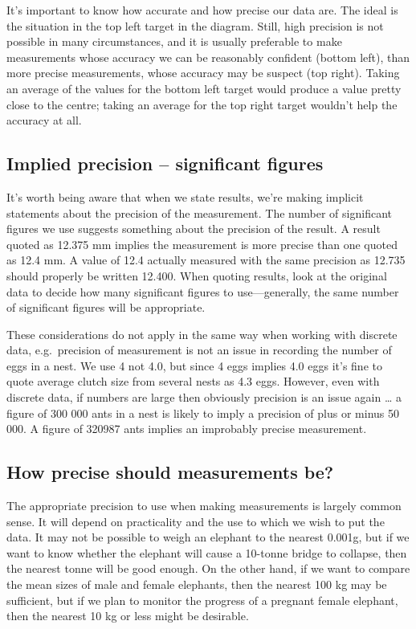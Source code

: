 \documentclass[
]{book}
\begin{document}
It's important to know how accurate and how precise our data are. The ideal is the situation in the top left target in the diagram. Still, high precision is not possible in many circumstances, and it is usually preferable to make measurements whose accuracy we can be reasonably confident (bottom left), than more precise measurements, whose accuracy may be suspect (top right). Taking an average of the values for the bottom left target would produce a value pretty close to the centre; taking an average for the top right target wouldn't help the accuracy at all.

\hypertarget{implied-precision-significant-figures}{%
\subsection{Implied precision -- significant figures}\label{implied-precision-significant-figures}}

It's worth being aware that when we state results, we're making implicit statements about the precision of the measurement. The number of significant figures we use suggests something about the precision of the result. A result quoted as 12.375 mm implies the measurement is more precise than one quoted as 12.4 mm. A value of 12.4 actually measured with the same precision as 12.735 should properly be written 12.400. When quoting results, look at the original data to decide how many significant figures to use---generally, the same number of significant figures will be appropriate.

These considerations do not apply in the same way when working with discrete data, e.g.~precision of measurement is not an issue in recording the number of eggs in a nest. We use 4 not 4.0, but since 4 eggs implies 4.0 eggs it's fine to quote average clutch size from several nests as 4.3 eggs. However, even with discrete data, if numbers are large then obviously precision is an issue again \ldots{} a figure of 300 000 ants in a nest is likely to imply a precision of plus or minus 50 000. A figure of 320987 ants implies an improbably precise measurement.

\hypertarget{how-precise-should-measurements-be}{%
\subsection{How precise should measurements be?}\label{how-precise-should-measurements-be}}

The appropriate precision to use when making measurements is largely common sense. It will depend on practicality and the use to which we wish to put the data. It may not be possible to weigh an elephant to the nearest 0.001g, but if we want to know whether the elephant will cause a 10-tonne bridge to collapse, then the nearest tonne will be good enough. On the other hand, if we want to compare the mean sizes of male and female elephants, then the nearest 100 kg may be sufficient, but if we plan to monitor the progress of a pregnant female elephant, then the nearest 10 kg or less might be desirable.
\end{document}

